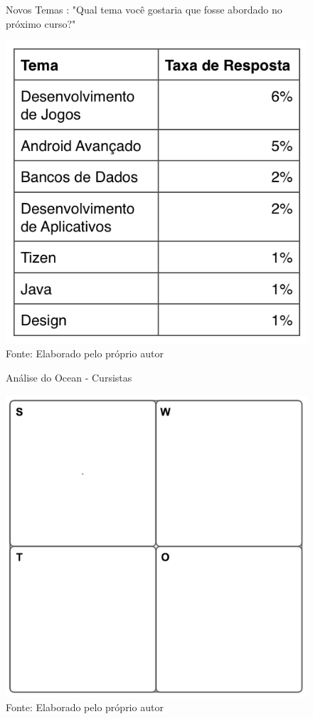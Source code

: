 \begin{figure}[H]
\caption{Novos Temas : "Qual tema você gostaria que fosse abordado no próximo curso?"}
\centerline{\includegraphics[scale=0.75]{img/temasfinaltable}}
\label{fig:temasfinaltable}
\caption* {Fonte: Elaborado pelo próprio autor}
\end{figure}

\begin{figure}[h]
\caption{Análise do Ocean - Cursistas}
\centerline{\includegraphics[scale=0.75]{img/generalswot}}
\label{fig:swotcursistas}
\caption* {Fonte: Elaborado pelo próprio autor}
\end{figure}
